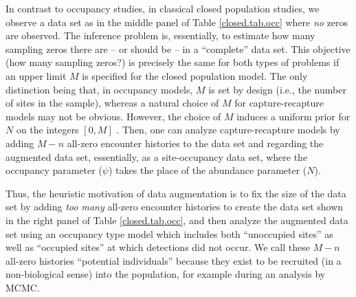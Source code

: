 In contrast to occupancy studies, in classical closed
population studies, we observe a data set as in the middle panel of
Table \ref{closed.tab.occ} where {\it no} zeros are observed. The
inference problem is, essentially, to estimate how many sampling zeros
there are -- or should be -- in a ``complete'' data set. This objective
(how many sampling zeros?) is precisely the same for both types of
problems if an upper limit $M$ is specified for the closed population
model. The only distinction being that, in occupancy models, $M$ is
set by design (i.e., the number of sites in the sample), whereas a natural
choice of $M$ for capture-recapture models may not be
obvious. However, the choice of $M$ induces a uniform prior for $N$ on
the integers $[0,M]$ \citep{royle_etal:2007}. Then, one can analyze
capture-recapture models by adding $M-n$ all-zero encounter histories
to the data set and regarding the augmented data set, essentially, as
a site-occupancy data set, where the occupancy parameter ($\psi$) takes
the place of the abundance parameter ($N$).

Thus, the heuristic motivation of data augmentation is to fix the size
of the data set by adding {\it too many} all-zero encounter histories
to create the data set shown in the right panel of Table
\ref{closed.tab.occ}, and then analyze the augmented data set using an
occupancy type model which includes both ``unoccupied sites'' as well
as ``occupied sites'' at which detections did not occur. We call these
$M-n$ all-zero histories ``potential individuals'' because they exist
to be recruited (in a non-biological sense) into the population, for
example during an analysis by MCMC.

